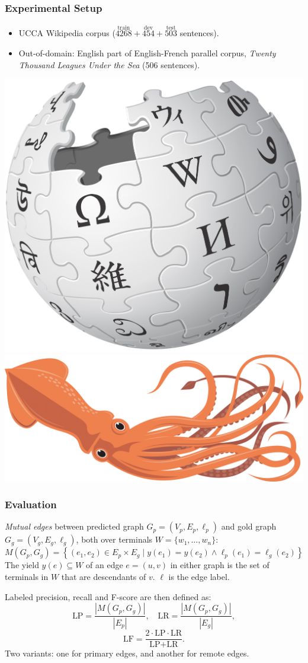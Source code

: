 \documentclass[t]{beamer}
\begin{document}
\begin{frame}
\frametitle{Experimental Setup}
\begin{itemize}
 \item UCCA Wikipedia corpus ($\stackrel{\text{train}}{4268}+\stackrel{\text{dev}}{454}+\stackrel{\text{test}}{503}$ sentences).
 \item Out-of-domain: English part of English-French parallel corpus,
 	\textit{Twenty Thousand Leagues Under the Sea} (506 sentences).
\end{itemize}

\vfill
\begin{center}
  \includegraphics[width=.5\linewidth]{wikipedia.png}
  \includegraphics[width=.5\linewidth]{squid.jpg}
\end{center}
\end{frame}

\begin{frame}
\frametitle{Evaluation}
\textit{Mutual edges} between predicted graph $G_p=(V_p,E_p,\ell_p)$
and gold graph $G_g=(V_g,E_g,\ell_g)$,
both over terminals $W = \{w_1,\ldots,w_n\}$:
\[
M(G_p,G_g) =
    \left\{(e_1,e_2) \in E_p \times E_g \;|\;
    y(e_1) = y(e_2) \wedge \ell_p(e_1)=\ell_g(e_2)\right\}
\]
The yield $y(e) \subseteq W$ of an edge $e=(u,v)$ in either graph
is the set of terminals in $W$ that are descendants of $v$. \hfill
$\ell$ is the edge label.

\vfill
Labeled precision, recall and F-score are then defined as:
\[
\text{LP} = \frac{|M(G_p,G_g)|}{|E_p|},\quad
\text{LR} = \frac{|M(G_p,G_g)|}{|E_g|},
\]
\[
\text{LF} = \frac{2 \cdot \text{LP} \cdot \text{LR}}{\text{LP} + \text{LR}}.
\]
Two variants:
one for primary edges, and another for remote edges.
\end{frame}
\end{document}
